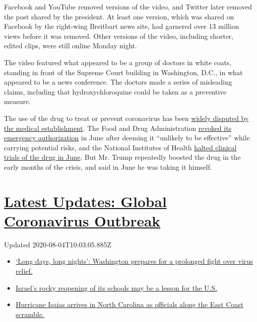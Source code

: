 Facebook and YouTube removed versions of the video, and Twitter later
removed the post shared by the president. At least one version, which
was shared on Facebook by the right-wing Breitbart news site, had
garnered over 13 million views before it was removed. Other versions of
the video, including shorter, edited clips, were still online Monday
night.

The video featured what appeared to be a group of doctors in white
coats, standing in front of the Supreme Court building in Washington,
D.C., in what appeared to be a news conference. The doctors made a
series of misleading claims, including that hydroxychloroquine could be
taken as a preventive measure.

The use of the drug to treat or prevent coronavirus has been
\href{https://www.nytimes3xbfgragh.onion/article/hydroxychloroquine-coronavirus.html}{widely
disputed by the medical establishment}. The Food and Drug Administration
\href{https://www.fda.gov/media/138945/download}{revoked its emergency
authorization} in June after deeming it ``unlikely to be effective''
while carrying potential risks, and the National Institutes of Health
\href{https://www.nytimes3xbfgragh.onion/2020/06/20/health/hydroxychloroquine-coronavirus-trial.html}{halted
clinical trials of the drug in June}. But Mr. Trump repeatedly boosted
the drug in the early months of the crisis, and said in June he was
taking it himself.

\hypertarget{latest-updates-global-coronavirus-outbreak}{%
\section{\texorpdfstring{\href{https://www.nytimes3xbfgragh.onion/2020/08/04/world/coronavirus-covid-19.html?action=click\&pgtype=Article\&state=default\&region=MAIN_CONTENT_1\&context=storylines_live_updates}{Latest
Updates: Global Coronavirus
Outbreak}}{Latest Updates: Global Coronavirus Outbreak}}\label{latest-updates-global-coronavirus-outbreak}}

Updated 2020-08-04T10:03:05.885Z

\begin{itemize}
\tightlist
\item
  \href{https://www.nytimes3xbfgragh.onion/2020/08/04/world/coronavirus-covid-19.html?action=click\&pgtype=Article\&state=default\&region=MAIN_CONTENT_1\&context=storylines_live_updates\#link-6b644638}{`Long
  days, long nights': Washington prepares for a prolonged fight over
  virus relief.}
\item
  \href{https://www.nytimes3xbfgragh.onion/2020/08/04/world/coronavirus-covid-19.html?action=click\&pgtype=Article\&state=default\&region=MAIN_CONTENT_1\&context=storylines_live_updates\#link-7af9fca0}{Israel's
  rocky reopening of its schools may be a lesson for the U.S.}
\item
  \href{https://www.nytimes3xbfgragh.onion/2020/08/04/world/coronavirus-covid-19.html?action=click\&pgtype=Article\&state=default\&region=MAIN_CONTENT_1\&context=storylines_live_updates\#link-33bf9168}{Hurricane
  Isaias arrives in North Carolina as officials along the East Coast
  scramble.}
\end{itemize}

